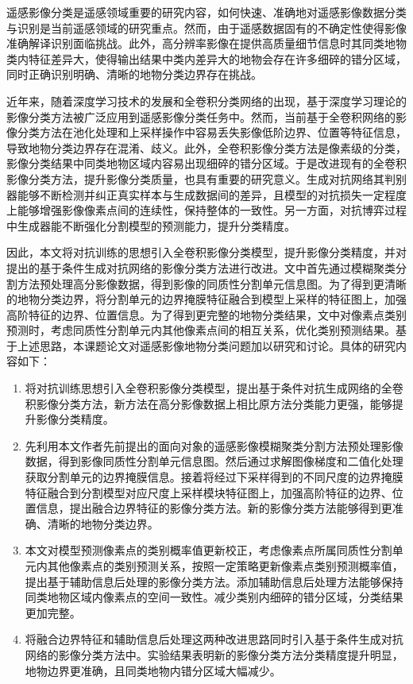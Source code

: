 \begin{cabstract}
  遥感影像分类是遥感领域重要的研究内容，如何快速、准确地对遥感影像数据分类与识别是当前遥感领域的研究重点。然而，由于遥感数据固有的不确定性使得影像准确解译识别面临挑战。此外，高分辨率影像在提供高质量细节信息时其同类地物类内特征差异大，使得输出结果中类内差异大的地物会存在许多细碎的错分区域，同时正确识别明确、清晰的地物分类边界存在挑战。

  近年来，随着深度学习技术的发展和全卷积分类网络的出现，基于深度学习理论的影像分类方法被广泛应用到遥感影像分类任务中。然而，当前基于全卷积网络的影像分类方法在池化处理和上采样操作中容易丢失影像低阶边界、位置等特征信息，导致地物分类边界存在混淆、歧义。此外，全卷积影像分类方法是像素级的分类，影像分类结果中同类地物区域内容易出现细碎的错分区域。于是改进现有的全卷积影像分类方法，提升影像分类质量，也具有重要的研究意义。生成对抗网络其判别器能够不断检测并纠正真实样本与生成数据间的差异，且模型的对抗损失一定程度上能够增强影像像素点间的连续性，保持整体的一致性。另一方面，对抗博弈过程中生成器能不断强化分割模型的预测能力，提升分类精度。
  
  因此，本文将对抗训练的思想引入全卷积影像分类模型，提升影像分类精度，并对提出的基于条件生成对抗网络的影像分类方法进行改进。文中首先通过模糊聚类分割方法预处理高分影像数据，得到影像的同质性分割单元信息图。为了得到更清晰的地物分类边界，将分割单元的边界掩膜特征融合到模型上采样的特征图上，加强高阶特征的边界、位置信息。为了得到更完整的地物分类结果，文中对像素点类别预测时，考虑同质性分割单元内其他像素点间的相互关系，优化类别预测结果。基于上述思路，本课题论文对遥感影像地物分类问题加以研究和讨论。具体的研究内容如下：
  \begin{enumerate}[(1)]
    \item 将对抗训练思想引入全卷积影像分类模型，提出基于条件对抗生成网络的全卷积影像分类方法，新方法在高分影像数据上相比原方法分类能力更强，能够提升影像分类精度。
    \item 先利用本文作者先前提出的面向对象的遥感影像模糊聚类分割方法预处理影像数据，得到影像同质性分割单元信息图。然后通过求解图像梯度和二值化处理获取分割单元的边界掩膜信息。接着将经过下采样得到的不同尺度的边界掩膜特征融合到分割模型对应尺度上采样模块特征图上，加强高阶特征的边界、位置信息，提出融合边界特征的影像分类方法。新的影像分类方法能够得到更准确、清晰的地物分类边界。
    \item 本文对模型预测像素点的类别概率值更新校正，考虑像素点所属同质性分割单元内其他像素点的类别预测关系，按照一定策略更新像素点类别预测概率值，提出基于辅助信息后处理的影像分类方法。添加辅助信息后处理方法能够保持同类地物区域内像素点的空间一致性。减少类别内细碎的错分区域，分类结果更加完整。
    \item 将融合边界特征和辅助信息后处理这两种改进思路同时引入基于条件生成对抗网络的影像分类方法中。实验结果表明新的影像分类方法分类精度提升明显，地物边界更准确，且同类地物内错分区域大幅减少。
  \end{enumerate}
\end{cabstract}


